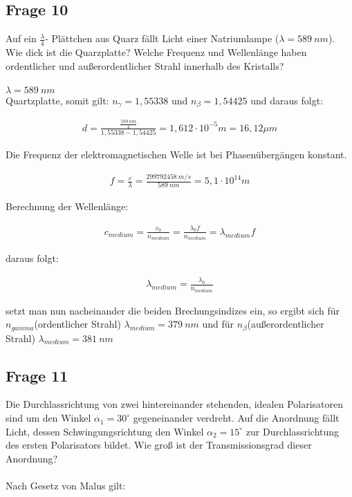 \documentclass[a4paper,10pt]{scrartcl}
\begin{document}
	    \subsection{Frage 10}
	    	Auf ein \(\frac{\lambda}{4}\)- Plättchen aus Quarz fällt Licht einer Natriumlampe (\(\lambda=\SI{589}{nm}\)). Wie dick ist
	    	die Quarzplatte? Welche Frequenz und Wellenlänge haben ordentlicher und außerordentlicher
	    	Strahl innerhalb des Kristalls?\\
	    	\\
	    	\(\lambda=\SI{589}{nm}\)\\
	    	Quartzplatte, somit gilt: \(n_{\gamma}=1,55338\) und \(n_{\beta}=1,54425\) und daraus folgt:
	    	
	    	\begin{align*}
	    	d=\frac{\frac{\SI{589}{nm}}{4}}{1,55338-1,54425}=1,612\cdot 10^{-5}m=16,12\mu m
	    	\end{align*}
	    	
	    	Die Frequenz der elektromagnetischen Welle ist bei Phasenübergängen konstant.
	    	
	    	\begin{align*}
	    	f=\frac{c}{\lambda}=\frac{\SI{299792458}{m/s}}{\SI{589}{nm}}=5,1\cdot 10^{14}m
	    	\end{align*}
	    	
	    	Berechnung der Wellenlänge:
	    	
	    	\begin{align*}
	    	c_{medium}=\frac{c_{0}}{n_{medium}}=\frac{\lambda_{0}f}{n_{medium}}=\lambda_{medium}f
	    	\end{align*}
	    	
	    	daraus folgt:
	    	
	    	\begin{align*}
	    	\lambda_{medium}=\frac{\lambda_{0}}{n_{medium}}
	    	\end{align*}
	    	
	    	setzt man nun nacheinander die beiden Brechungsindizes ein, so ergibt sich für \(n_{gamma}\)(ordentlicher Strahl) \(\lambda_{medium}=\SI{379}{nm}\) und für \(n_{\beta}\)(außerordentlicher Strahl) \(\lambda_{medium}=\SI{381}{nm}\)
	    	
	    \subsection{Frage 11}
	    	Die Durchlassrichtung von zwei hintereinander stehenden, idealen Polarisatoren sind um den
	    	Winkel \(\alpha_{1}=30^{\circ}\) gegeneinander verdreht. Auf die Anordnung fällt Licht, dessen Schwingungsrichtung
	    	den Winkel \(\alpha_{2}=15^{\circ}\) zur Durchlassrichtung des ersten Polarisators bildet. Wie groß
	    	ist der Transmissionsgrad dieser Anordnung?\\
	    	\\
	    	Nach Gesetz von Malus gilt:
	    	
\end{document}
